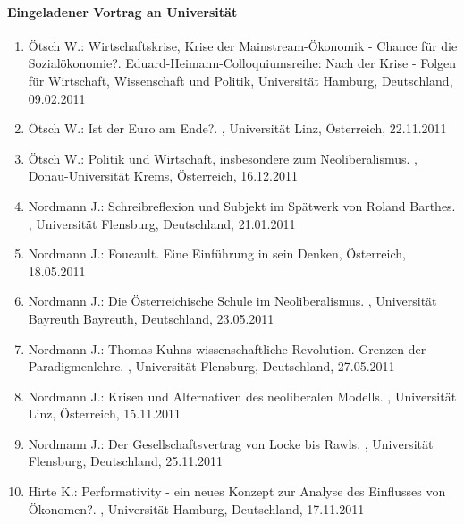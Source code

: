 \paragraph{Eingeladener Vortrag an Universität}
\begin{enumerate}
	\item Ötsch W.: Wirtschaftskrise, Krise der Mainstream-Ökonomik - Chance für die Sozialökonomie?. Eduard-Heimann-Colloquiumsreihe: Nach der Krise - Folgen für Wirtschaft, Wissenschaft und Politik, Universität Hamburg, Deutschland, 09.02.2011
	\item Ötsch W.: Ist der Euro am Ende?. , Universität Linz, Österreich, 22.11.2011
	\item Ötsch W.: Politik und Wirtschaft, insbesondere zum Neoliberalismus. , Donau-Universität Krems, Österreich, 16.12.2011
	\item Nordmann J.: Schreibreflexion und Subjekt im Spätwerk von Roland Barthes. , Universität Flensburg, Deutschland, 21.01.2011
	\item Nordmann J.: Foucault. Eine Einführung in sein Denken, Österreich, 18.05.2011
	\item Nordmann J.: Die Österreichische Schule im Neoliberalismus. , Universität Bayreuth Bayreuth, Deutschland, 23.05.2011
	\item Nordmann J.: Thomas Kuhns wissenschaftliche Revolution. Grenzen der Paradigmenlehre. , Universität Flensburg, Deutschland, 27.05.2011
	\item Nordmann J.: Krisen und Alternativen des neoliberalen Modells. , Universität Linz, Österreich, 15.11.2011
	\item Nordmann J.: Der Gesellschaftsvertrag von Locke bis Rawls. , Universität Flensburg, Deutschland, 25.11.2011
	\item Hirte K.: Performativity - ein neues Konzept zur Analyse des Einflusses von Ökonomen?. , Universität Hamburg, Deutschland, 17.11.2011
\end{enumerate}
